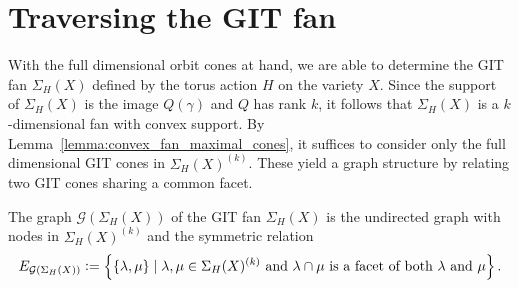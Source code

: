 \section{Traversing the GIT fan}

With the full dimensional orbit cones at hand, we are able to determine the GIT fan $\Sigma_H(X)$ defined by the torus action $H$ on the variety $X$. Since the support of $\Sigma_H(X)$ is the image $Q(\gamma)$ and $Q$ has rank $k$, it follows that $\Sigma_H(X)$ is a $k$-dimensional fan with convex support.
%
By Lemma~\ref{lemma:convex_fan_maximal_cones}, it suffices to consider only the full dimensional GIT cones in $\Sigma_H(X)^{(k)}$. These yield a graph structure by relating two GIT cones sharing a common facet.

\begin{defi}
	The graph $\mathcal{G}(\Sigma_H(X))$ of the GIT fan $\Sigma_H(X)$ is the undirected graph with nodes in $\Sigma_H(X)^{(k)}$ and the symmetric relation
	$$E_{\mathcal{G}(\Sigma_H(X))} \mathrel{\mathop:}= \left\{\{\lambda, \mu\} \mid \lambda, \mu \in \Sigma_H(X)^{(k)} \text{ and }\lambda \cap \mu \text{ is a facet of both }\lambda\text{ and }\mu\right\}.$$
\end{defi}

